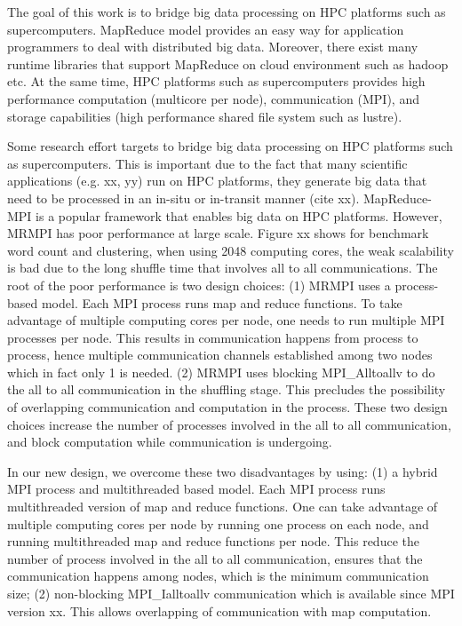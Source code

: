 \documentclass[10pt,conference,compsocconf]{IEEEtran}
\begin{document}
The goal of this work is to bridge big data processing on HPC platforms 
such as supercomputers. MapReduce model provides an easy way for
application programmers to deal with distributed big data. Moreover,
there exist many runtime libraries that support MapReduce on cloud
environment such as hadoop etc. At the same time, HPC platforms such
as supercomputers provides high performance computation (multicore per node),
 communication (MPI), and storage capabilities (high performance shared
 file system such as lustre).

Some research effort targets to bridge big data processing
on HPC platforms such as supercomputers. This is important due to
the fact that many scientific applications (e.g. xx, yy) run on HPC platforms,
they generate big data that need to be processed in an in-situ or in-transit manner
(cite xx). MapReduce-MPI is a popular framework that enables big data
on HPC platforms. However, MRMPI has poor performance at large
scale. Figure xx shows for benchmark word count and clustering,
when using 2048 computing cores, the weak scalability is bad due to
the long shuffle time that involves all to all communications. The root
of the poor performance is two design choices: (1) MRMPI uses a process-based
model. Each MPI process runs map and reduce functions. To take advantage
of multiple computing cores per node, one needs to run multiple MPI
processes per node. This results in communication happens 
from process to process, hence multiple communication channels established
among two nodes which in fact only 1 is needed. (2) MRMPI uses blocking
MPI\_Alltoallv to do the all to all communication in the shuffling stage. This
precludes the possibility of overlapping communication and computation
in the process. These two design choices increase the number of
processes involved in the all to all communication, and block computation
while communication is undergoing. 

In our new design, we overcome these two disadvantages by using:
(1) a hybrid MPI process and multithreaded based model. Each MPI
process runs multithreaded version of map and reduce functions. One
can take advantage of multiple computing cores per node by running
one process on each node, and running multithreaded map and reduce
functions per node. This reduce the number of process involved in the
all to all communication, ensures that the communication happens 
among nodes, which is the minimum communication size; (2) non-blocking
MPI\_Ialltoallv communication which is available since MPI version xx.
This allows overlapping of communication with map computation.
\end{document}
